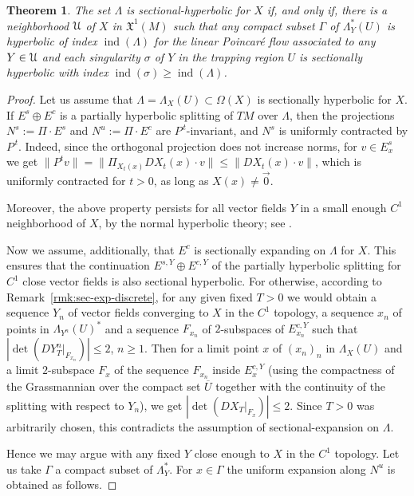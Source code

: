 \documentclass[12pt,reqno]{amsart}
\numberwithin{equation}{section}
\theoremstyle{plain}
\newtheorem{theorem}{Theorem}[section]
\theoremstyle{definition}
\newcommand{\indi}{\operatorname{ind}}
\newcommand{\U}{\EuScript{U}}
\newcommand{\Mundo}{\mathfrak{X}^{1}(M)}
\begin{document}
\begin{theorem}\label{thm:2secexp-LPFhyp}
  The set $\Lambda$ is sectional-hyperbolic for $X$ if, and
  only if, there is a neighborhood $\U$ of $X$ in $\Mundo$
  such that any compact subset $\Gamma$ of $\Lambda^*_Y(U)$
  is hyperbolic of index $\indi(\Lambda)$ for the linear
  Poincar\'e flow associated to any $Y\in\U$ and each
  singularity $\sigma$ of $Y$ in the trapping region $U$ is
  sectionally hyperbolic with index $\indi(\sigma) \geq
  \indi(\Lambda)$.
\end{theorem}

\begin{proof} Let us assume that
  $\Lambda=\Lambda_X(U)\subset\Omega(X)$ is sectionally
  hyperbolic for $X$.  If $E^s\oplus E^c$ is a
  partially hyperbolic splitting of $TM$ over
  $\Lambda$, then the projections $N^s:=\Pi\cdot E^s$
  and $N^u:=\Pi\cdot E^c$ are $P^{\,t}$-invariant, and
  $N^s$ is uniformly contracted by $P^{\,t}$. Indeed,
  since the orthogonal projection does not increase
  norms, for $v\in E^s_x$ we get $\|P^t
  v\|=\|\Pi_{X_t(x)} DX_t(x)\cdot v\|\le\|DX_t(x)\cdot
  v\|$, which is uniformly contracted for $t>0$, as
  long as $X(x)\neq\vec0$.

  Moreover, the above property persists for all vector
  fields $Y$ in a small enough $C^1$ neighborhood of $X$, by
  the normal hyperbolic theory; see \cite{HPS77}.

  Now we assume, additionally, that $E^c$ is sectionally
  expanding on $\Lambda$ for $X$. This ensures that the
  continuation $E^{s,Y}\oplus E^{c,Y}$ of the partially
  hyperbolic splitting for $C^1$ close vector fields is also
  sectional hyperbolic. For otherwise, according to
  Remark~\ref{rmk:sec-exp-discrete}, for any given fixed
  $T>0$ we would obtain a sequence $Y_n$ of vector fields
  converging to $X$ in the $C^1$ topology, a sequence $x_n$
  of points in $\Lambda_{Y^n}(U)^*$ and a sequence $F_{x_n}$
  of $2$-subspaces of $E^{c,Y}_{x_n}$ such that
  $|\det(DY^n_T\vert_{F_{x_n}})|\le2$, $n\ge1$. Then for a
  limit point $x$ of $(x_n)_n$ in $\Lambda_X(U)$ and a limit
  $2$-subspace $F_x$ of the sequence $F_{x_n}$ inside
  $E^{c,Y}_x$ (using the compactness of the Grassmannian
  over the compact set $\overline{U}$ together with the
  continuity of the splitting with respect to $Y_n$), we get
  $|\det(DX_T\vert_{F_x})|\le 2$. Since $T>0$ was
  arbitrarily chosen, this contradicts the assumption of
  sectional-expansion on $\Lambda$.

  Hence we may argue with any fixed $Y$ close enough to $X$
  in the $C^1$ topology.  Let us take $\Gamma$ a compact
  subset of $\Lambda^*_Y$. For $x\in\Gamma$ the uniform
  expansion along $N^u$ is obtained as follows.


\end{proof}
\end{document}
